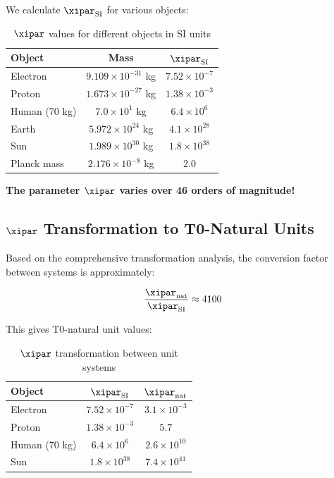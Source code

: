 	We calculate $\xipar_{\text{SI}}$ for various objects:
	
	\begin{table}[htbp]
		\centering
		\begin{tabular}{lcc}
			\toprule
			\textbf{Object} & \textbf{Mass} & \textbf{$\xipar_{\text{SI}}$} \\
			\midrule
			Electron & $9.109 \times 10^{-31}$ kg & $7.52 \times 10^{-7}$ \\
			Proton & $1.673 \times 10^{-27}$ kg & $1.38 \times 10^{-3}$ \\
			Human (70 kg) & $7.0 \times 10^{1}$ kg & $6.4 \times 10^{6}$ \\
			Earth & $5.972 \times 10^{24}$ kg & $4.1 \times 10^{28}$ \\
			Sun & $1.989 \times 10^{30}$ kg & $1.8 \times 10^{38}$ \\
			Planck mass & $2.176 \times 10^{-8}$ kg & $2.0$ \\
			\bottomrule
		\end{tabular}
		\caption{$\xipar$ values for different objects in SI units}
		\label{tab:xi_si_values}
	\end{table}
	
	\textbf{The parameter $\xipar$ varies over 46 orders of magnitude!}
	
	\subsection{$\xipar$ Transformation to T0-Natural Units}
	\label{subsec:xi_transformation}
	
	Based on the comprehensive transformation analysis, the conversion factor between systems is approximately:
	
	$$\frac{\xipar_{\text{nat}}}{\xipar_{\text{SI}}} \approx 4100$$
	
	This gives T0-natural unit values:
	
	\begin{table}[htbp]
		\centering
		\begin{tabular}{lcc}
			\toprule
			\textbf{Object} & \textbf{$\xipar_{\text{SI}}$} & \textbf{$\xipar_{\text{nat}}$} \\
			\midrule
			Electron & $7.52 \times 10^{-7}$ & $3.1 \times 10^{-3}$ \\
			Proton & $1.38 \times 10^{-3}$ & $5.7$ \\
			Human (70 kg) & $6.4 \times 10^{6}$ & $2.6 \times 10^{10}$ \\
			Sun & $1.8 \times 10^{38}$ & $7.4 \times 10^{41}$ \\
			\bottomrule
		\end{tabular}
		\caption{$\xipar$ transformation between unit systems}
		\label{tab:xi_transformation}
	\end{table}
	
